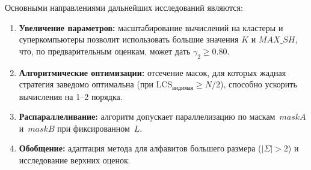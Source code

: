 \documentclass[12pt,a4paper]{article}
\begin{document}
Основными направлениями дальнейших исследований являются:
\begin{enumerate}
  \item \textbf{Увеличение параметров:} масштабирование вычислений на кластеры и суперкомпьютеры позволит использовать большие значения $K$ и $\mathit{MAX\_SH}$, что, по предварительным оценкам, может дать $\gamma_2 \geq 0.80$.
  \item \textbf{Алгоритмические оптимизации:} отсечение масок, для которых жадная стратегия заведомо оптимальна (при $\mathrm{LCS}_{\text{видимая}} \geq N/2$), способно ускорить вычисления на 1--2 порядка.
  \item \textbf{Распараллеливание:} алгоритм допускает параллелизацию по маскам~$\mathit{maskA}$ и~$\mathit{maskB}$ при фиксированном~$L$.
  \item \textbf{Обобщение:} адаптация метода для алфавитов большего размера ($|\Sigma| > 2$) и исследование верхних оценок.
\end{enumerate}
\end{document}
